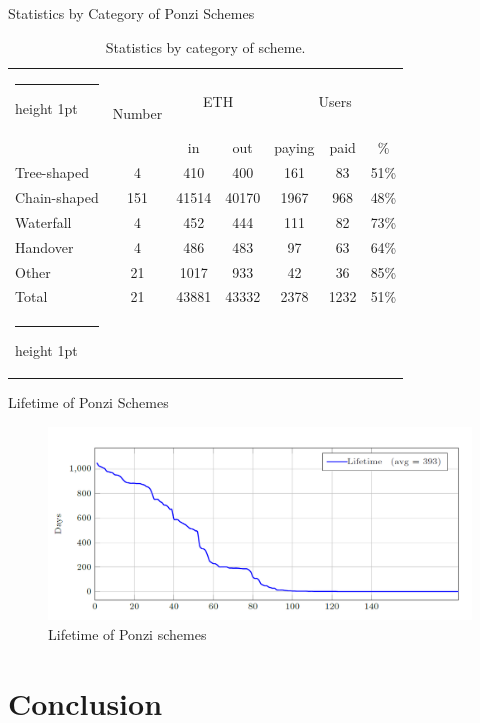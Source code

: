 \documentclass[aspectratio=169,10pt]{beamer}
\makeatletter
\newcommand{\thickhline}{%
    \noalign {\ifnum 0=`}\fi \hrule height 1pt
    \futurelet \reserved@a \@xhline
}
\makeatother
\begin{document}
\begin{frame}{Statistics by Category of Ponzi Schemes}

\begin{table}
\begin{tabular}{l|c|cc|ccc}
\thickhline
\multirow{2}{*}{Category} & \multirow{2}{*}{Number} & \multicolumn{2}{c|}{ETH}  & \multicolumn{3}{c}{Users} \\
 & & in & out & paying & paid & \% \\\hline
Tree-shaped  & 4   & 410   & 400   & 161  & 83  & 51\% \\
Chain-shaped & 151 & 41514 & 40170 & 1967 & 968 & 48\% \\
Waterfall    & 4   & 452   & 444   & 111  & 82  & 73\% \\
Handover     & 4   & 486   & 483   & 97   & 63  & 64\% \\
Other        & 21  & 1017  & 933   & 42   & 36  & 85\% \\\hline
Total        & 21  & 43881 & 43332 & 2378 & 1232 & 51\%\\\thickhline
\end{tabular}
\caption{Statistics by category of scheme.}
\end{table}

\end{frame}

\begin{frame}{Lifetime of Ponzi Schemes}

\begin{figure}
    \centering
    \includegraphics[width=\textwidth]{images/lifetime.png}
    \caption{Lifetime of Ponzi schemes}
    \label{fig:lifetime}
\end{figure}

\end{frame}

\section{Conclusion}
\end{document}
